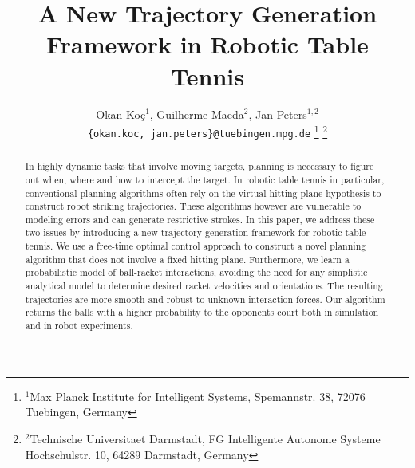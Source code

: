 \documentclass[letterpaper, 10 pt, conference]{ieeeconf}
\author{Okan Ko\c c$^{1}$, Guilherme Maeda$^{2}$, Jan Peters$^{1,2}$%
\\
{\tt\small \{okan.koc, jan.peters\}@tuebingen.mpg.de}%
\thanks{$^{1}$Max Planck Institute for Intelligent Systems,
        Spemannstr. 38, 72076 Tuebingen, Germany}
\thanks{$^{2}$Technische Universitaet Darmstadt, FG Intelligente Autonome Systeme
        Hochschulstr. 10, 64289 Darmstadt, Germany}
}
\title{A New Trajectory Generation Framework in Robotic Table Tennis}
\begin{document}
\maketitle
\thispagestyle{empty}
\pagestyle{empty}

\begin{abstract}

In highly dynamic tasks that involve moving targets, planning is necessary to figure out when, where and how to intercept the target. In robotic table tennis in particular, conventional planning algorithms often rely on the virtual hitting plane hypothesis to construct robot striking trajectories. These algorithms however are vulnerable to modeling errors and can generate restrictive strokes. In this paper, we address these two issues by introducing a new trajectory generation framework for robotic table tennis. We use a free-time optimal control approach to construct a novel planning algorithm that does not involve a fixed hitting plane. Furthermore, we learn a probabilistic model of ball-racket interactions, avoiding the need for any simplistic analytical model to determine desired racket velocities and orientations. The resulting trajectories are more smooth and robust to unknown interaction forces. Our algorithm returns the balls with a higher probability to the opponents court both in simulation and in robot experiments.



\end{abstract}










%
%

\end{document}
